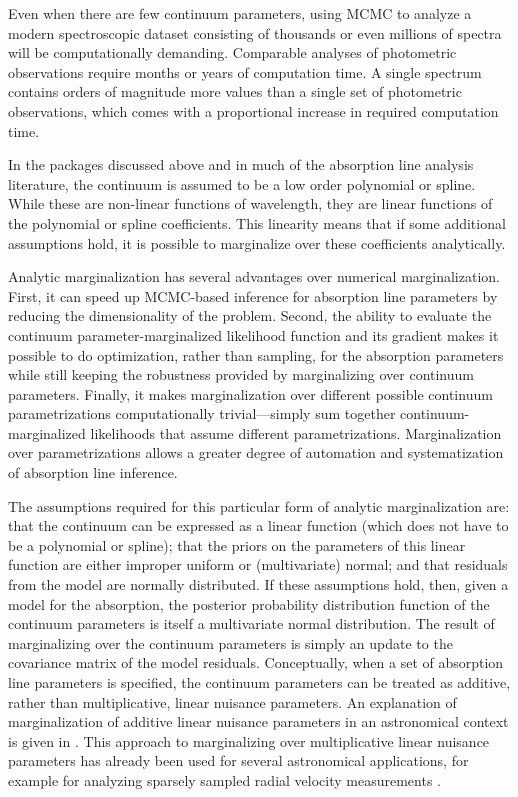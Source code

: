 \documentclass[manuscript]{aastex62}
\begin{document}
Even when there are few continuum parameters, using MCMC to analyze a modern spectroscopic dataset consisting of thousands or even millions of spectra will be computationally demanding.
Comparable analyses of photometric observations \citep{2015ApJ...810...25G,2016ApJ...826..104G} require months or years of computation time.
A single spectrum contains orders of magnitude more values than a single set of photometric observations, which comes with a proportional increase in required computation time.

In the packages discussed above and in much of the absorption line analysis literature, the continuum is assumed to be a low order polynomial or spline.
While these are non-linear functions of wavelength, they are linear functions of the polynomial or spline coefficients.
This linearity means that if some additional assumptions hold, it is possible to marginalize over these coefficients analytically.

Analytic marginalization has several advantages over numerical marginalization.
First, it can speed up MCMC-based inference for absorption line parameters by reducing the dimensionality of the problem.
Second, the ability to evaluate the continuum parameter-marginalized likelihood function and its gradient makes it possible to do optimization, rather than sampling, for the absorption parameters while still keeping the robustness provided by marginalizing over continuum parameters.
Finally, it makes marginalization over different possible continuum parametrizations computationally trivial---simply sum together continuum-marginalized likelihoods that assume different parametrizations.
Marginalization over parametrizations allows a greater degree of automation and systematization of absorption line inference.

The assumptions required for this particular form of analytic marginalization are: that the continuum can be expressed as a linear function (which does not have to be a polynomial or spline); that the priors on the parameters of this linear function are either improper uniform or (multivariate) normal; and that residuals from the model are normally distributed.
If these assumptions hold, then, given a model for the absorption, the posterior probability distribution function of the continuum parameters is itself a multivariate normal distribution.
The result of marginalizing over the continuum parameters is simply an update to the covariance matrix of the model residuals.
Conceptually, when a set of absorption line parameters is specified, the continuum parameters can be treated as additive, rather than multiplicative, linear nuisance parameters.
An explanation of marginalization of additive linear nuisance parameters in an astronomical context is given in \citet{2017RNAAS...1a...7L}.
This approach to marginalizing over multiplicative linear nuisance parameters has already been used for several astronomical applications, for example for analyzing sparsely sampled radial velocity measurements \citep{2017ApJ...837...20P}.
\end{document}
